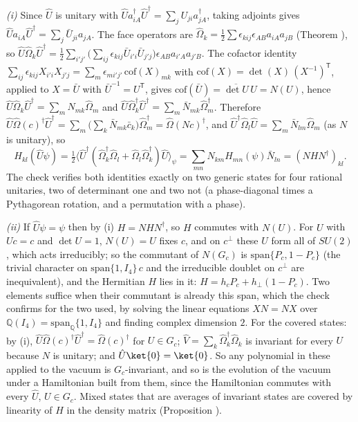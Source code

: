 \emph{(i)} Since $\hat{U}$ is unitary with $\hat{U}a_{iA}^{\dagger}\hat{U}^{\dagger} = \sum_{j}U_{ji}a_{jA}^{\dagger}$, taking adjoints gives $\hat{U}a_{iA}\hat{U}^{\dagger} = \sum_{j}\bar{U}_{ji}a_{jA}$. The face operators are $\hat\Omega_{k} = \tfrac12\sum\epsilon_{kij}\epsilon_{AB}a_{iA}a_{jB}$ (Theorem ), so $\hat{U}\hat\Omega_{k}\hat{U}^{\dagger} = \tfrac12\sum_{i'j'}\bigl(\sum_{ij}\epsilon_{kij}\bar{U}_{i'i}\bar{U}_{j'j}\bigr)\epsilon_{AB}a_{i'A}a_{j'B}$. The cofactor identity $\sum_{ij}\epsilon_{kij}X_{i'i}X_{j'j} = \sum_{m}\epsilon_{m i'j'}\,\mathrm{cof}(X)_{mk}$ with $\mathrm{cof}(X) = \det(X)\,(X^{-1})^{\mathsf{T}}$, applied to $X = \bar{U}$ with $\bar{U}^{-1} = U^{\mathsf{T}}$, gives $\mathrm{cof}(\bar{U}) = \overline{\det U}\,U = N(U)$, hence $\hat{U}\hat\Omega_{k}\hat{U}^{\dagger} = \sum_{m}N_{mk}\hat\Omega_{m}$ and $\hat{U}\hat\Omega_{k}^{\dagger}\hat{U}^{\dagger} = \sum_{m}\bar{N}_{mk}\hat\Omega_{m}^{\dagger}$. Therefore $\hat{U}\hat\Omega(c)^{\dagger}\hat{U}^{\dagger} = \sum_{m}\bigl(\sum_{k}\bar{N}_{mk}\bar{c}_{k}\bigr)\hat\Omega_{m}^{\dagger} = \hat\Omega(Nc)^{\dagger}$, and $\hat{U}^{\dagger}\hat\Omega_{l}\hat{U} = \sum_{m}\bar{N}_{lm}\hat\Omega_{m}$ (as $N$ is unitary), so
\[
H_{kl}(\hat{U}\psi) = \tfrac12\bigl\langle\hat{U}^{\dagger}(\hat\Omega_{k}^{\dagger}\hat\Omega_{l} + \hat\Omega_{l}\hat\Omega_{k}^{\dagger})\hat{U}\bigr\rangle_{\psi} = \sum_{mn}N_{km}H_{mn}(\psi)\bar{N}_{ln} = (NHN^{\dagger})_{kl}.
\]
The check verifies both identities exactly on two generic states for four rational unitaries, two of determinant one and two not (a phase-diagonal times a Pythagorean rotation, and a permutation with a phase).

\emph{(ii)} If $\hat{U}\psi = \psi$ then by (i) $H = NHN^{\dagger}$, so $H$ commutes with $N(U)$. For $U$ with $Uc = c$ and $\det U = 1$, $N(U) = U$ fixes $c$, and on $c^{\perp}$ these $U$ form all of $SU(2)$, which acts irreducibly; so the commutant of $N(G_{c})$ is $\mathrm{span}\{P_{c}, 1 - P_{c}\}$ (the trivial character on $\mathrm{span}\{1, I_4\}\,c$ and the irreducible doublet on $c^{\perp}$ are inequivalent), and the Hermitian $H$ lies in it: $H = h_{c}P_{c} + h_{\perp}(1 - P_{c})$. Two elements suffice when their commutant is already this span, which the check confirms for the two used, by solving the linear equations $XN = NX$ over $\mathbb{Q}(I_4) = \mathrm{span}_{\mathbb{Q}}\{1, I_4\}$ and finding complex dimension $2$. For the covered states: by (i), $\hat{U}\hat\Omega(c)^{\dagger}\hat{U}^{\dagger} = \hat\Omega(c)^{\dagger}$ for $U \in G_{c}$; $\hat{V} = \sum_{k}\hat\Omega_{k}^{\dagger}\hat\Omega_{k}$ is invariant for every $U$ because $N$ is unitary; and $\hat{U}\ket{0} = \ket{0}$. So any polynomial in these applied to the vacuum is $G_{c}$-invariant, and so is the evolution of the vacuum under a Hamiltonian built from them, since the Hamiltonian commutes with every $\hat{U}$, $U \in G_{c}$. Mixed states that are averages of invariant states are covered by linearity of $H$ in the density matrix (Proposition ).

